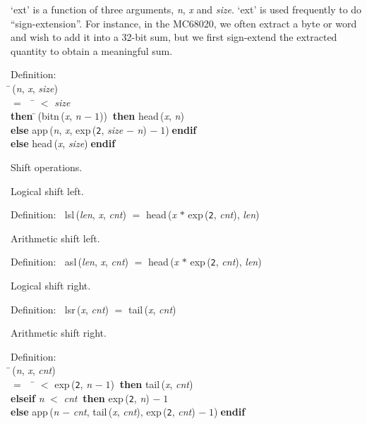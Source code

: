  `ext' is a function of three arguments, {\it{n\/}}, {\it{x\/}} and {\it{size\/}}.  `ext' is used
 frequently to do ``sign-extension''.  For instance, in the MC68020,
 we often extract a byte or word and wish to add it into a 32-bit sum,
 but we first sign-extend the extracted quantity to obtain a meaningful
 sum.
\begin{tabbing}{\sc Definition}: \\  
\=\,({\it{n\/}}, {\it{x\/}}, {\it{size\/}}) \\ 
$=$$\;\;\;\;$\= $<$ {\it{size\/}} \\ 
{\bf then }\=\,({\rm{bitn}}\,({\it{x\/}}, {\it{n\/}} $-\;1$))$\;\;${\bf then }{\rm{head}}\,({\it{x\/}}, {\it{n\/}}) \\ 
{\bf else }{\rm{app}}\,({\it{n\/}}, {\it{x\/}}, {\rm{exp}}\,({\tt{2}}, {\it{size\/}} $-$ {\it{n\/}}) $-\;1$)$\;${\bf  endif}\- \\ 
{\bf else }{\rm{head}}\,({\it{x\/}}, {\it{size\/}})$\;${\bf  endif}\-\-
\end{tabbing}

 Shift operations.

 Logical shift left.
\begin{tabbing}{\sc Definition}:$\;\;$
{\rm{lsl}}\,({\it{len\/}}, {\it{x\/}}, {\it{cnt\/}}) $=$ {\rm{head}}\,({\it{x\/}} $*$ {\rm{exp}}\,({\tt{2}}, {\it{cnt\/}}), {\it{len\/}})
\end{tabbing}

 Arithmetic shift left.
\begin{tabbing}{\sc Definition}:$\;\;$
{\rm{asl}}\,({\it{len\/}}, {\it{x\/}}, {\it{cnt\/}}) $=$ {\rm{head}}\,({\it{x\/}} $*$ {\rm{exp}}\,({\tt{2}}, {\it{cnt\/}}), {\it{len\/}})
\end{tabbing}

 Logical shift right.
\begin{tabbing}{\sc Definition}:$\;\;$
{\rm{lsr}}\,({\it{x\/}}, {\it{cnt\/}}) $=$ {\rm{tail}}\,({\it{x\/}}, {\it{cnt\/}})
\end{tabbing}

 Arithmetic shift right.
\begin{tabbing}{\sc Definition}: \\  
\=\,({\it{n\/}}, {\it{x\/}}, {\it{cnt\/}}) \\ 
$=$$\;\;\;\;$\= $<$ {\rm{exp}}\,({\tt{2}}, {\it{n\/}} $-\;1$)$\;\;${\bf then }{\rm{tail}}\,({\it{x\/}}, {\it{cnt\/}}) \\ 
{\bf elseif }{\it{n\/}} $<$ {\it{cnt\/}}$\;\;${\bf then }{\rm{exp}}\,({\tt{2}}, {\it{n\/}}) $-\;1$ \\ 
{\bf else }{\rm{app}}\,({\it{n\/}} $-$ {\it{cnt\/}}, {\rm{tail}}\,({\it{x\/}}, {\it{cnt\/}}), {\rm{exp}}\,({\tt{2}}, {\it{cnt\/}}) $-\;1$)$\;${\bf  endif}\-\-
\end{tabbing}

